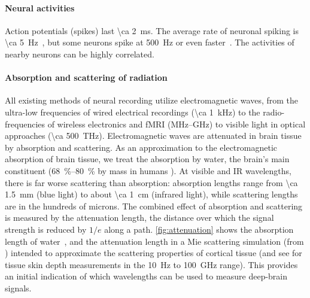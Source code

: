 \paragraph{Neural activities}
Action potentials (spikes) last \SI{\ca 2}{\milli\second}.
The average rate of neuronal spiking is \SI{\ca 5}{\hertz}~\cite{sarpeshkar10}, but some neurons spike at \SI{500}{\hertz} or even faster~\cite{gittis10}.
The activities of nearby neurons can be highly correlated.

\paragraph{Absorption and scattering of radiation}
All existing methods of neural recording utilize electromagnetic waves, from the ultra-low frequencies of wired electrical recordings (\SI{\ca 1}{\kilo\hertz}) to the radio-frequencies of wireless electronics and fMRI (MHz--GHz) to visible light in optical approaches (\SI{\ca 500}{\tera\hertz}).
Electromagnetic waves are attenuated in brain tissue by absorption and scattering.
As an approximation to the electromagnetic absorption of brain tissue, we treat the absorption by water, the brain's main constituent (\SIrange{68}{80}{\percent} by mass in humans \cite{dobbing73,fatouros99}).
At visible and IR wavelengths, there is far worse scattering than absorption: absorption lengths range from \SI{\ca 1.5}{\milli\meter} (blue light) to about \SI{\ca 1}{\centi\meter} (infrared light), while scattering lengths are in the hundreds of microns.
The combined effect of absorption and scattering is measured by the attenuation length, the distance over which the signal strength is reduced by $1/e$ along a path.
\autoref{fig:attenuation} shows the absorption length of water~\cite{kou93}, and the attenuation length in a Mie scattering simulation (from \cite{horton13}) intended to approximate the scattering properties of cortical tissue (and see \cite{gabriel1996} for tissue skin depth measurements in the \SI{10}{\hertz} to \SI{100}{\giga\hertz} range).
This provides an initial indication of which wavelengths can be used to measure deep-brain signals.

